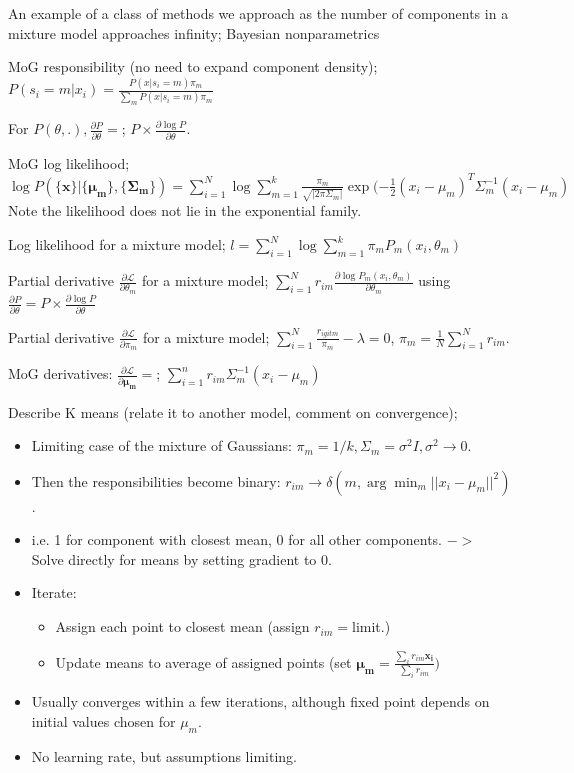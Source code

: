 \documentclass{article}
\begin{document}
An example of a class of methods we approach as the number of components in a mixture model approaches infinity; Bayesian nonparametrics

MoG responsibility (no need to expand component density); $P(s_i=m|x_i) = \frac{P(x|s_i=m)\pi_m}{\sum_m P(x|s_i=m)\pi_m}$

For $P(\theta, .), \frac{\partial P}{\partial \theta} =$; $P\times \frac{\partial\log P}{\partial \theta}$.

MoG log likelihood; $\log P(\{\mathbf{x}\}|\{\mathbf{\mu_m} \},\{\mathbf{\Sigma_m} \}) = \sum_{i=1}^N\log \sum_{m=1}^k \frac{\pi_m}{\sqrt{|2\pi\Sigma_m|}}\exp(-\frac{1}{2}(x_i-\mu_m)^T\Sigma^{-1}_m(x_i-\mu_m)$ \newline Note the likelihood does not lie in the exponential family.

Log likelihood for a mixture model; $l=\sum_{i=1}^N\log \sum_{m=1}^k \pi_mP_m(x_i, \theta_m)$

Partial derivative $\frac{\partial \mathcal{L}}{\partial \theta_m}$ for a mixture model; $\sum_{i=1}^N r_{im} \frac{\partial\log P_m(x_i, \theta_m)}{\partial\theta_m}$ using $\frac{\partial P}{\partial \theta} = P \times \frac{\partial\log P}{\partial \theta}$

Partial derivative $\frac{\partial \mathcal{L}}{\partial \pi_m}$ for a mixture model; $\sum_{i=1}^N \frac{r_{igit m}}{\pi_m}-\lambda = 0$, $\pi_m = \frac{1}{N}\sum_{i=1}^N r_{im}$.

MoG derivatives: $\frac{\partial \mathcal{L}}{\partial \mathbf{\mu_m}} =$; $\sum_{i=1}^n r_{im}\Sigma^{-1}_m(x_i-\mu_m)$


Describe K means (relate it to another model, comment on convergence); \begin{itemize} \item Limiting case of the mixture of Gaussians: $\pi_m = 1/k, \Sigma_m=\sigma^2I, \sigma^2\rightarrow 0$.  \item Then the responsibilities become binary: $r_{im}\rightarrow\delta(m, \arg\min_m ||x_i-\mu_m||^2)$.  \item i.e. 1 for component with closest mean, 0 for all other components. $->$ Solve directly for means by setting gradient to 0.  \item Iterate: \begin{itemize} \item Assign each point to closest mean (assign $r_{im}=$limit.) \item Update means to average of assigned points (set $\mathbf{\mu_m}=\frac{\sum_i r_{im}\mathbf{x_i}}{\sum_i r_{im}})$ \end{itemize} \item Usually converges within a few iterations, although fixed point depends on initial values chosen for $\mu_m$.  \item No learning rate, but assumptions limiting.  \end{itemize}
\end{document}
